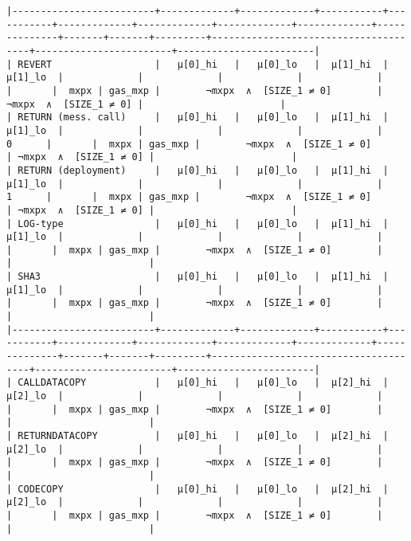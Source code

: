 \documentclass[varwidth=\maxdimen,margin=0.5cm,multi={verbatim}]{standalone}
\begin{document}
\begin{verbatim}
|-------------------------+-------------+-------------+-----------+-----------+-------------+-------------+-------------+-------------+--------------+-------+-------+---------+--------------------------------------+------------------------+------------------------|
| REVERT                  |   μ[0]_hi   |   μ[0]_lo   |  μ[1]_hi  |  μ[1]_lo  |             |             |             |             |              |       |  mxpx | gas_mxp |        ¬mxpx  ∧  [SIZE_1 ≠ 0]        | ¬mxpx  ∧  [SIZE_1 ≠ 0] |                        |
| RETURN (mess. call)     |   μ[0]_hi   |   μ[0]_lo   |  μ[1]_hi  |  μ[1]_lo  |             |             |             |             |       0      |       |  mxpx | gas_mxp |        ¬mxpx  ∧  [SIZE_1 ≠ 0]        | ¬mxpx  ∧  [SIZE_1 ≠ 0] |                        |
| RETURN (deployment)     |   μ[0]_hi   |   μ[0]_lo   |  μ[1]_hi  |  μ[1]_lo  |             |             |             |             |       1      |       |  mxpx | gas_mxp |        ¬mxpx  ∧  [SIZE_1 ≠ 0]        | ¬mxpx  ∧  [SIZE_1 ≠ 0] |                        |
| LOG-type                |   μ[0]_hi   |   μ[0]_lo   |  μ[1]_hi  |  μ[1]_lo  |             |             |             |             |              |       |  mxpx | gas_mxp |        ¬mxpx  ∧  [SIZE_1 ≠ 0]        |                        |                        |
| SHA3                    |   μ[0]_hi   |   μ[0]_lo   |  μ[1]_hi  |  μ[1]_lo  |             |             |             |             |              |       |  mxpx | gas_mxp |        ¬mxpx  ∧  [SIZE_1 ≠ 0]        |                        |                        |
|-------------------------+-------------+-------------+-----------+-----------+-------------+-------------+-------------+-------------+--------------+-------+-------+---------+--------------------------------------+------------------------+------------------------|
| CALLDATACOPY            |   μ[0]_hi   |   μ[0]_lo   |  μ[2]_hi  |  μ[2]_lo  |             |             |             |             |              |       |  mxpx | gas_mxp |        ¬mxpx  ∧  [SIZE_1 ≠ 0]        |                        |                        |
| RETURNDATACOPY          |   μ[0]_hi   |   μ[0]_lo   |  μ[2]_hi  |  μ[2]_lo  |             |             |             |             |              |       |  mxpx | gas_mxp |        ¬mxpx  ∧  [SIZE_1 ≠ 0]        |                        |                        |
| CODECOPY                |   μ[0]_hi   |   μ[0]_lo   |  μ[2]_hi  |  μ[2]_lo  |             |             |             |             |              |       |  mxpx | gas_mxp |        ¬mxpx  ∧  [SIZE_1 ≠ 0]        |                        |                        |

\end{verbatim}
\end{document}
